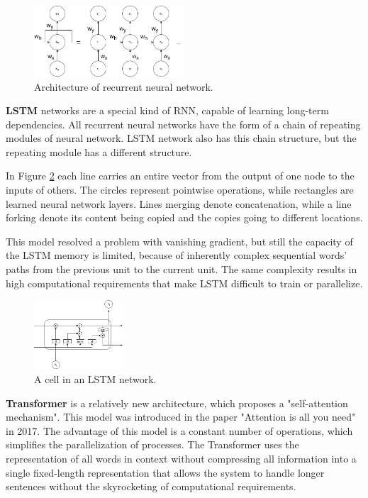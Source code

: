 \begin{figure}[hbt]
  \centering
  \includegraphics[width=0.5\textwidth]{figures/rnn.jpg}
  \caption{Architecture of recurrent neural network.}
  \label{rnn}
\end{figure}


\textbf{LSTM} networks are a special kind of RNN, capable of learning long-term dependencies. All recurrent neural networks have the form of a chain of repeating modules of neural network. LSTM network also has this chain structure, but the repeating module has a different structure. 

In Figure \ref{lstm} each line carries an entire vector from the output of one node to the inputs of others. The circles represent pointwise operations, while rectangles are learned neural network layers. Lines merging denote concatenation, while a line forking denote its content being copied and the copies going to different locations.

This model resolved a problem with vanishing gradient, but still the capacity of the LSTM memory is limited, because of inherently complex sequential words' paths from the previous unit to the current unit. The same complexity results in high computational requirements that make LSTM difficult to train or parallelize.

\begin{figure}[hbt]
  \centering
  \includegraphics[width=0.3\textwidth]{figures/lstm.jpg}
  \caption{A cell in an LSTM network.}
  \label{lstm}
\end{figure}


\textbf{Transformer} is a relatively new architecture, which proposes a "self-attention mechanism". This model was introduced in the paper "Attention is all you need" \cite{transformer} in 2017. The advantage of this model is a constant number of operations, which simplifies the parallelization of processes. The Transformer uses the representation of all words in context without compressing all information into a single fixed-length representation that allows the system to handle longer sentences without the skyrocketing of computational requirements. 

